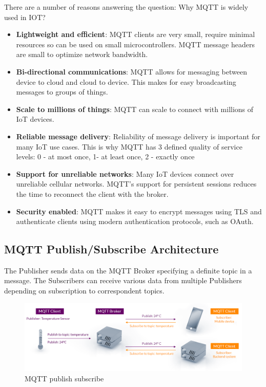 \documentclass[\main/main.tex]{subfiles}
\begin{document}
There are a number of reasons answering the question: Why MQTT is widely used in IOT? 
\begin{itemize}
    \item \textbf{Lightweight and efficient}: MQTT clients are very small, require minimal resources so can be used on small microcontrollers. MQTT message headers are small to optimize network bandwidth.
    \item \textbf{Bi-directional communications}: MQTT allows for messaging between device to cloud and cloud to device. This makes for easy broadcasting messages to groups of things.
    \item \textbf{Scale to millions of things}: MQTT can scale to connect with millions of IoT devices.
    \item \textbf{Reliable message delivery}: Reliability of message delivery is important for many IoT use cases. This is why MQTT has 3 defined quality of service levels: 0 - at most once, 1- at least once, 2 - exactly once
    \item \textbf{Support for unreliable networks}: Many IoT devices connect over unreliable cellular networks. MQTT’s support for persistent sessions reduces the time to reconnect the client with the broker.
    \item \textbf{Security enabled}: MQTT makes it easy to encrypt messages using TLS and authenticate clients using modern authentication protocols, such as OAuth.
\end{itemize}

\subsection{MQTT Publish/Subscribe Architecture \cite{web_mqtt_ref}}
The Publisher sends data on the MQTT Broker specifying a definite topic in a message. The Subscribers can receive various data from multiple Publishers depending on subscription to correspondent topics.
\begin{figure}[H]
    \begin{center}
        \includegraphics[scale=0.35]{mqtt-publish-subscribe.png}
    \end{center}
    \caption{MQTT publish subscribe}
    \label{fig:mqtt_publish_subscribe}
\end{figure}
\end{document}
